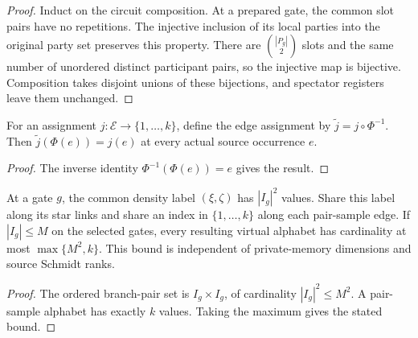 \begin{proof}\leanok
    Induct on the circuit composition. At a prepared gate, the common
    slot pairs have no repetitions. The injective inclusion of its local
    parties into the original party set preserves this property. There
    are $\binom{|P_g|}{2}$ slots and the same number of unordered distinct
    participant pairs, so the injective map is bijective. Composition
    takes disjoint unions of these bijections, and spectator registers
    leave them unchanged.
\end{proof}

\begin{theorem}
    \label{thm:peps_sampled_source_indices}
    \leanok
    For an assignment $j:\mathcal E\to\{1,\ldots,k\}$, define the
    edge assignment by $\widetilde j=j\circ\Phi^{-1}$. Then
    $\widetilde j(\Phi(e))=j(e)$ at every actual source occurrence $e$.
\end{theorem}

\begin{proof}\leanok
    The inverse identity $\Phi^{-1}(\Phi(e))=e$ gives the result.
\end{proof}

\begin{theorem}
    \label{thm:peps_sampled_source_dimensions}
    \leanok
    At a gate $g$, the common density label $(\xi,\zeta)$ has
    $|I_g|^2$ values. Share this label along its star links and share an
    index in $\{1,\ldots,k\}$ along each pair-sample edge. If $|I_g|\le M$
    on the selected gates, every resulting virtual alphabet has
    cardinality at most $\max\{M^2,k\}$. This bound is independent of
    private-memory dimensions and source Schmidt ranks.
\end{theorem}

\begin{proof}\leanok
    The ordered branch-pair set is $I_g\times I_g$, of cardinality
    $|I_g|^2\le M^2$. A pair-sample alphabet has exactly $k$ values.
    Taking the maximum gives the stated bound.
\end{proof}

